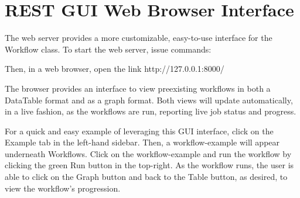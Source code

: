 \hypertarget{rest-gui-web-browser-interface}{%
\section{REST GUI Web Browser
Interface}\label{rest-gui-web-browser-interface}}

The web server provides a more customizable, easy-to-use interface for
the Workflow class. To start the web server, issue commands:

\begin{Shaded}
\begin{Highlighting}[]
\end{Highlighting}
\end{Shaded}

Then, in a web browser, open the link http://127.0.0.1:8000/

The browser provides an interface to view preexisting workflows in both
a DataTable format and as a graph format. Both views will update
automatically, in a live fashion, as the workflows are run, reporting
live job status and progress.

For a quick and easy example of leveraging this GUI interface, click on
the Example tab in the left-hand sidebar. Then, a workflow-example will
appear underneath Workflows. Click on the workflow-example and run the
workflow by clicking the green Run button in the top-right. As the
workflow runs, the user is able to click on the Graph button and back to
the Table button, as desired, to view the workflow's progression.
